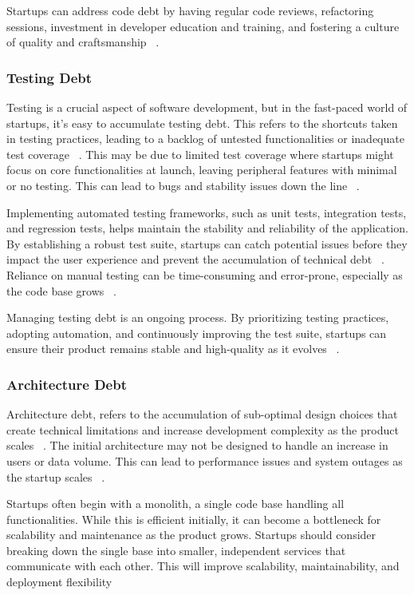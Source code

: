 Startups can address code debt by having regular code reviews, refactoring sessions, investment in developer education and training, and fostering a culture of quality and craftsmanship ~\cite{10043622, Acknowle63:online}.

\subsubsection{Testing Debt}
Testing is a crucial aspect of software development, but in the fast-paced world of startups, it's easy to accumulate testing debt. This refers to the shortcuts taken in testing practices, leading to a backlog of untested functionalities or inadequate test coverage  ~\cite{Howtohan98:online}. This may be due to limited test coverage where startups might focus on core functionalities at launch, leaving peripheral features with minimal or no testing. This can lead to bugs and stability issues down the line ~\cite{Totalqua26:online}.

Implementing automated testing frameworks, such as unit tests, integration tests, and regression tests, helps maintain the stability and reliability of the application. By establishing a robust test suite, startups can catch potential issues before they impact the user experience and prevent the accumulation of technical debt ~\cite{TheImpac54:online}. Reliance on manual testing can be time-consuming and error-prone, especially as the code base grows ~\cite{Howtohan98:online}.

Managing testing debt is an ongoing process. By prioritizing testing practices, adopting automation, and continuously improving the test suite, startups can ensure their product remains stable and high-quality as it evolves ~\cite{CrowneWhyStartupsFail, 1NewMess49:online}.

\subsubsection{Architecture Debt}
Architecture debt, refers to the accumulation of sub-optimal design choices that create technical limitations and increase development complexity as the product scales ~\cite{Startups4:online}. The initial architecture may not be designed to handle an increase in users or data volume. This can lead to performance issues and system outages as the startup scales ~\cite{Qualityv77:online}.

Startups often begin with a monolith, a single code base handling all functionalities. While this is efficient initially, it can become a bottleneck for scalability and maintenance as the product grows. Startups should consider breaking down the single base into smaller, independent services that communicate with each other. This will improve scalability, maintainability, and deployment flexibility ~\cite{Howtohan98:online, DesignSt86:online}

